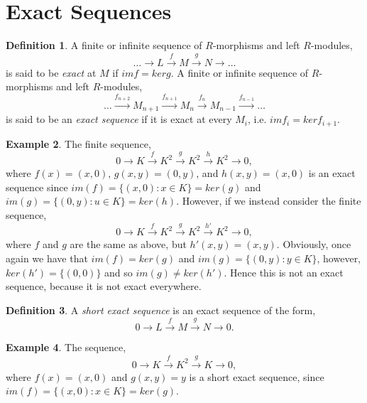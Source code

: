 \documentclass[11.5pt, twoside, a4paper, titlepage]{report}
\theoremstyle{definition}
\newtheorem{mydef}{Definition}[section]
\newtheorem{eg}[mydef]{Example}
\theoremstyle{plain}
\begin{document}
\section{Exact Sequences}

\begin{mydef}
A finite or infinite sequence of $R$-morphisms and left $R$-modules,
\begin{equation*}
\dots \xrightarrow{} L \xrightarrow{f}M \xrightarrow{g} N \xrightarrow{} \dots
\end{equation*}
is said to be \emph{exact} at $M$ if $imf=kerg$. A finite or infinite sequence of $R$-morphisms and left $R$-modules,
\begin{equation*}
\dots \xrightarrow{f_{n+2}} M_{n+1} \xrightarrow{f_{n+1}} M_n \xrightarrow{f_n} M_{n-1} \xrightarrow{f_{n-1}} \dots
\end{equation*}
is said to be an \emph{exact sequence} if it is exact at every $M_i$, i.e. $imf_i=kerf_{i+1}$.
\end{mydef}

\begin{eg}
The finite sequence,
\begin{equation*}
0\xrightarrow{}K\xrightarrow{f}K^2\xrightarrow{g}K^2\xrightarrow{h}K^2\xrightarrow{}0,
\end{equation*}
where $f(x)=(x,0)$, $g(x, y)=(0,y)$, and $h(x,y)=(x,0)$ is an exact sequence since $im(f)=\{(x,0):x\in K\}=ker(g)$ and $im(g)=\{(0,y):u\in K\}=ker(h)$. 
However, if we instead consider the finite sequence, 
\begin{equation*}
0\xrightarrow{}K\xrightarrow{f}K^2\xrightarrow{g}K^2\xrightarrow{h'}K^2\xrightarrow{}0,
\end{equation*}
where $f$ and $g$ are the same as above, but $h'(x,y)=(x,y)$. Obviously, once again we have that $im(f)=ker(g)$ and $im(g)=\{(0,y):y\in K\}$, however, $ker(h')=\{(0,0)\}$ and so $im(g)\neq ker(h')$. Hence this is not an exact sequence, because it is not exact everywhere.
\end{eg}


\begin{mydef}
A \emph{short exact sequence} is an exact sequence of the form,
\begin{equation*}
0\xrightarrow{}L\xrightarrow{f}M\xrightarrow{g}N\xrightarrow{}0.
\end{equation*}
\end{mydef}

\begin{eg}
The sequence,
\begin{equation*}
0\xrightarrow{} K \xrightarrow{f} K^2 \xrightarrow{g} K \xrightarrow{} 0,
\end{equation*}
where $f(x)=(x,0)$ and $g(x,y)=y$ is a short exact sequence, since $im(f)=\{(x,0): x\in K\}=ker(g)$.
\end{eg}
\end{document}
